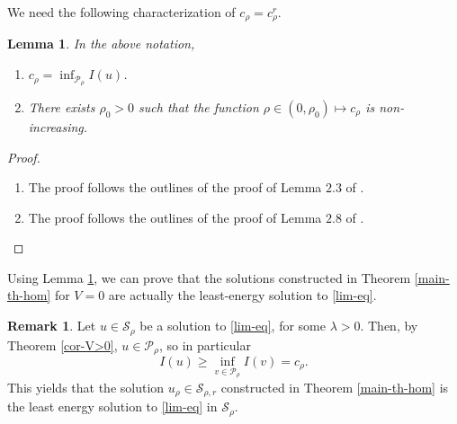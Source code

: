 \documentclass[11pt,reqno]{amsart}
\newtheorem{lemma}[theorem]{Lemma}
\theoremstyle{definition}
\newtheorem{remark}[theorem]{Remark}
\numberwithin{equation}{section}
\numberwithin{theorem}{section}
\numberwithin{equation}{section}
\numberwithin{theorem}{section}
\newcommand{\R}{\mathbb{R}}
\begin{document}
We need the following characterization of $c_\rho=c^r_\rho$.
\begin{lemma}\label{lemma-characterization}
In the above notation,
\begin{enumerate}
\item $c_\rho=\inf_{\mathcal{P}_\rho}I(u)$.
\item There exists $\rho_0>0$ such that the function $\rho\in(0,\rho_0)\mapsto c_\rho$ is non-increasing.
\end{enumerate}
\end{lemma}
\begin{proof}
\begin{enumerate}
\item The proof follows the outlines of the proof of Lemma $2.3$ of \cite{WLZL}.
\item The proof follows the outlines of the proof of Lemma $2.8$ of \cite{WLZL}.
\end{enumerate}
\end{proof}
Using Lemma \ref{lemma-characterization}, we can prove that the solutions constructed in Theorem \ref{main-th-hom} for $V=0$ are actually the least-energy solution to \eqref{lim-eq}.
\begin{remark}\label{lemma-least-en}
Let $u\in\mathcal{S}_\rho$ be a solution to \eqref{lim-eq}, for some $\lambda>0$. Then, by Theorem \ref{cor-V>0}, $u\in \mathcal{P}_\rho$, so in particular $$I(u)\ge\inf_{v\in\mathcal{P}_\rho} I(v)=c_{\rho}.$$  
This yields that the solution $u_\rho\in \mathcal{S}_{\rho,r}$ constructed in Theorem \ref{main-th-hom} is the least energy solution to \eqref{lim-eq} in $\mathcal{S}_\rho$.
\end{remark}
\end{document}
